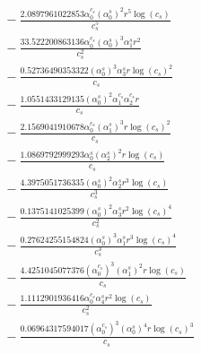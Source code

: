 \documentclass[10pt]{article}
\begin{document}
\begin{align*}
&{}  - \frac{2.0897961022853 \alpha_{0}^{c_s} \left(\alpha_{0}^s\right)^{2} r^{5} \log{\left(c_{s} \right)}}{c_{s}^{5}} \\
&{}  - \frac{33.522200863136 \alpha_{0}^{c_s} \left(\alpha_{0}^s\right)^{3} \alpha_{1}^s r^{2}}{c_{s}^{2}} \\
&{}  - \frac{0.52736490353322 \left(\alpha_{0}^s\right)^{3} \alpha_{3}^s r \log{\left(c_{s} \right)}^{2}}{c_{s}} \\
&{}  - \frac{1.0551433129135 \left(\alpha_{0}^s\right)^{2} \alpha_{1}^{c_s} \alpha_{2}^{c_s} r}{c_{s}} \\
&{}  - \frac{2.1569041910678 \alpha_{0}^{c_s} \left(\alpha_{1}^s\right)^{3} r \log{\left(c_{s} \right)}^{2}}{c_{s}} \\
&{}  - \frac{1.0869792999293 \alpha_{0}^s \left(\alpha_{2}^s\right)^{2} r \log{\left(c_{s} \right)}}{c_{s}} \\
&{}  - \frac{4.3975051736335 \left(\alpha_{0}^s\right)^{2} \alpha_{2}^s r^{3} \log{\left(c_{s} \right)}}{c_{s}^{3}} \\
&{}  - \frac{0.1375141025399 \left(\alpha_{0}^s\right)^{2} \alpha_{3}^s r^{2} \log{\left(c_{s} \right)}^{4}}{c_{s}^{2}} \\
&{}  - \frac{0.27624255154824 \left(\alpha_{0}^s\right)^{3} \alpha_{1}^s r^{3} \log{\left(c_{s} \right)}^{4}}{c_{s}^{3}} \\
&{}  - \frac{4.4251045077376 \left(\alpha_{0}^{c_s}\right)^{3} \left(\alpha_{1}^s\right)^{2} r \log{\left(c_{s} \right)}}{c_{s}} \\
&{}  - \frac{1.1112901936416 \alpha_{0}^{c_s} \alpha_{4}^s r^{2} \log{\left(c_{s} \right)}}{c_{s}^{2}} \\
&{}  - \frac{0.06964317594017 \left(\alpha_{0}^{c_s}\right)^{3} \left(\alpha_{0}^s\right)^{4} r \log{\left(c_{s} \right)}^{3}}{c_{s}}
\end{align*}
\end{document}
